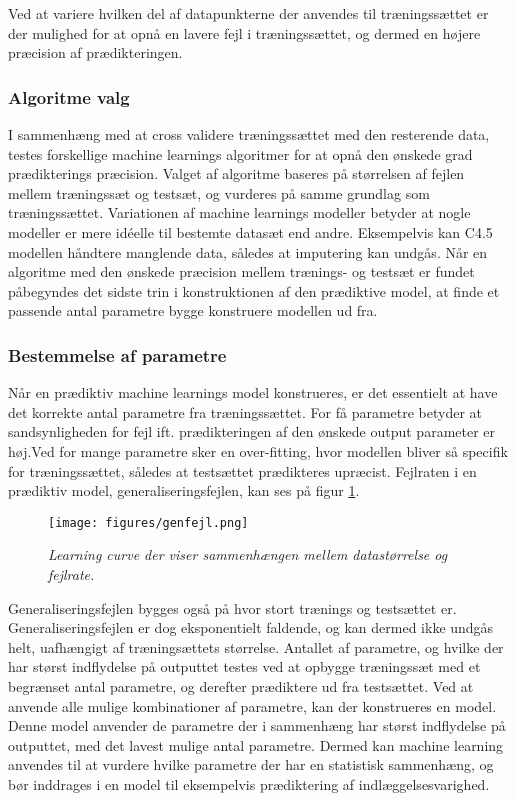 \noindent
Ved at variere hvilken del af datapunkterne der anvendes til træningssættet er der mulighed for at opnå en lavere fejl i træningssættet, og dermed en højere præcision af prædikteringen.\cite{Kuhn2013} 


\subsubsection{Algoritme valg} \label{algovalg}
I sammenhæng med at cross validere træningssættet med den resterende data, testes forskellige machine learnings algoritmer for at opnå den ønskede grad prædikterings præcision.\cite{Kuhn2013} Valget af algoritme baseres på størrelsen af fejlen mellem træningssæt og testsæt, og vurderes på samme grundlag som træningssættet. Variationen af machine learnings modeller betyder at nogle modeller er mere idéelle til bestemte datasæt end andre. Eksempelvis kan C4.5 modellen håndtere manglende data, således at imputering kan undgås. Når en algoritme med den ønskede præcision mellem trænings- og testsæt er fundet påbegyndes det sidste trin i konstruktionen af den prædiktive model, at finde et passende antal parametre bygge konstruere modellen ud fra.\cite{DIKU2010}    

\subsubsection{Bestemmelse af parametre}
Når en prædiktiv machine learnings model konstrueres, er det essentielt at have det korrekte antal parametre fra træningssættet. For få parametre betyder at sandsynligheden for fejl ift. prædikteringen af den ønskede output parameter er høj.Ved for mange parametre sker en over-fitting, hvor modellen bliver så specifik for træningssættet, således at testsættet prædikteres upræcist.\cite{DIKU2010} Fejlraten i en prædiktiv model, generaliseringsfejlen, kan ses på figur \ref{fig:genfejl}.


\begin{figure}[H]
	\centering
	\texttt{[image: figures/genfejl.png]}
	\caption{\textit{Learning curve der viser sammenhængen mellem datastørrelse og fejlrate.\cite{Kuhn2013}}}
	\label{fig:genfejl}
\end{figure}

\noindent
Generaliseringsfejlen bygges også på hvor stort trænings og testsættet er. Generaliseringsfejlen er dog eksponentielt faldende, og kan dermed ikke undgås helt, uafhængigt af træningsættets størrelse.\cite{DIKU2010}
Antallet af parametre, og hvilke der har størst indflydelse på outputtet testes ved at opbygge træningssæt med et begrænset antal parametre, og derefter prædiktere ud fra testsættet. Ved at anvende alle mulige kombinationer af parametre, kan der konstrueres en model. Denne model anvender de parametre der i sammenhæng har størst indflydelse på outputtet, med det lavest mulige antal parametre. Dermed kan machine learning anvendes til at vurdere hvilke parametre der har en statistisk sammenhæng, og bør inddrages i en model til eksempelvis prædiktering af indlæggelsesvarighed.\cite{Kuhn2013,DIKU2010} 